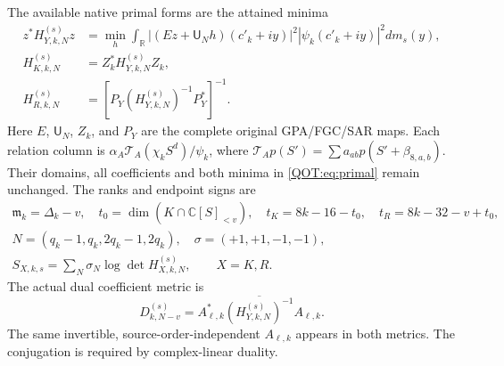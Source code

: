 \documentclass[11pt,a4paper]{article}
\providecommand{\C}{\mathbb C}
\providecommand{\R}{\mathbb R}
\begin{document}
The available native primal forms are the attained minima
\begin{equation}
\begin{split}
 z^*H_{Y,k,N}^{(s)}z
 &=\min_h\int_{\R}|(Ez+\mathsf U_Nh)(c'_k+iy)|^2
                   |\psi_k(c'_k+iy)|^2dm_s(y),\\
 H_{K,k,N}^{(s)}&=Z_k^*H_{Y,k,N}^{(s)}Z_k,\\
 H_{R,k,N}^{(s)}&=[P_Y(H_{Y,k,N}^{(s)})^{-1}P_Y^*]^{-1}.
\end{split}\label{QOT:eq:primal}
\tag{QOT4}
\end{equation}
Here $E$, $\mathsf U_N$, $Z_k$, and $P_Y$ are the complete original GPA/FGC/SAR maps. Each relation column is $\alpha_A\mathcal T_A(\chi_k S^d)/\psi_k$, where $\mathcal T_Ap(S')=\sum a_{ab}p(S'+\beta_{8,a,b})$. Their domains, all coefficients and both minima in \eqref{QOT:eq:primal} remain unchanged.
The ranks and endpoint signs are
\begin{equation}
\begin{gathered}
 \mathfrak m_k=\Delta_k-v,\quad t_0=\dim(K\cap\C[S]_{<v}),\quad
 t_K=8k-16-t_0,\quad t_R=8k-32-v+t_0,\\
 N=(q_k-1,q_k,2q_k-1,2q_k),\quad \sigma=(+1,+1,-1,-1),\\
 S_{X,k,s}=\sum_N\sigma_N\log\det H_{X,k,N}^{(s)},\qquad X=K,R.
\end{gathered}\label{QOT:eq:alloc}
\tag{QOT5}
\end{equation}
The actual dual coefficient metric is
\begin{equation}
 D_{k,N-v}^{(s)}=A_{\ell,k}^*\overline{(H_{Y,k,N}^{(s)})^{-1}}A_{\ell,k}.
 \label{QOT:eq:dual}
\tag{QOT6}
\end{equation}
The same invertible, source-order-independent $A_{\ell,k}$ appears in both metrics. The conjugation is required by complex-linear duality.
\end{document}
